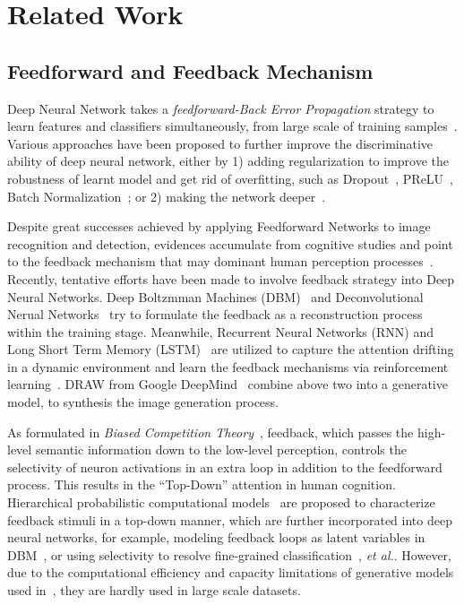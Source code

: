 \section{Related Work}
\label{sec:related_work}

\subsection{Feedforward and Feedback Mechanism}
Deep Neural Network takes a \emph{feedforward-Back Error Propagation} strategy to learn features and classifiers simultaneously, from large scale of training samples~\cite{Krizhevsky2012ImageNet,Simonyan2014Very,lin2013network,salakhutdinov2009deep,bengio2013representation}. Various approaches have been proposed to further improve the discriminative ability of deep neural network, either by 1) adding regularization to improve the robustness of learnt model and get rid of overfitting, such as Dropout~\cite{srivastava2014dropout}, PReLU~\cite{he2015delving}, Batch Normalization~\cite{ioffe2015batch}; or 2) making the network deeper~\cite{Szegedy2014Going,Simonyan2014Very}.

Despite great successes achieved by applying Feedforward Networks to image recognition and detection, evidences accumulate from cognitive studies and point to the feedback mechanism that may dominant human perception processes~\cite{Cichy2014Resolving,Rust:2010if,Kruger2013Deep,lee2003hierarchical}. Recently, tentative efforts have been made to involve feedback strategy into Deep Neural Networks. Deep Boltzmman Machines (DBM)~\cite{salakhutdinov2009deep} and Deconvolutional Nerual Networks~\cite{Zeiler:2011hy} try to formulate the feedback as a reconstruction process within the training stage. Meanwhile, Recurrent Neural Networks (RNN) and Long Short Term Memory (LSTM)~\cite{hochreiter1997long} are utilized to capture the attention drifting in a dynamic environment and learn the feedback mechanisms via reinforcement learning~\cite{Stollenga:2014tl,Mnih:2014ti}. DRAW from Google DeepMind~\cite{gregor2015draw} combine above two into a generative model, to synthesis the image generation process.

As formulated in \emph{Biased Competition Theory}~\cite{beck2009top,desimone1995neural}, feedback, which passes the high-level semantic information down to the low-level perception, controls the selectivity of neuron activations in an extra loop in addition to the feedforward process. This results in the ``Top-Down'' attention in human cognition. Hierarchical probabilistic computational models~\cite{lee2003hierarchical} are proposed to characterize feedback stimuli in a top-down manner, which are further incorporated into deep neural networks, for example, modeling feedback loops as latent variables in DBM~\cite{wang2014attentional}, or using selectivity to resolve fine-grained classification~\cite{Mnih:2014ti}, \emph{et al.}. However, due to the computational efficiency and capacity limitations of generative models used in~\cite{Mnih:2014ti,wang2014attentional}, they are hardly used in large scale datasets.

